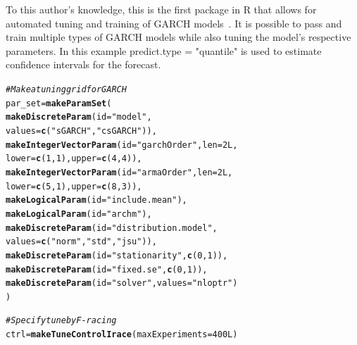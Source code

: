 \documentclass[12pt]{article}\usepackage[]{graphicx}\usepackage[]{color}
\makeatletter
\newcommand{\hlnum}[1]{\textcolor[rgb]{0.686,0.059,0.569}{#1}}%
\newcommand{\hlstr}[1]{\textcolor[rgb]{0.192,0.494,0.8}{#1}}%
\newcommand{\hlcom}[1]{\textcolor[rgb]{0.678,0.584,0.686}{\textit{#1}}}%
\newcommand{\hlstd}[1]{\textcolor[rgb]{0.345,0.345,0.345}{#1}}%
\newcommand{\hlkwb}[1]{\textcolor[rgb]{0.69,0.353,0.396}{#1}}%
\newcommand{\hlkwc}[1]{\textcolor[rgb]{0.333,0.667,0.333}{#1}}%
\newcommand{\hlkwd}[1]{\textcolor[rgb]{0.737,0.353,0.396}{\textbf{#1}}}%
\newenvironment{kframe}{%
 \def\at@end@of@kframe{}%
 \ifinner\ifhmode%
  \def\at@end@of@kframe{\end{minipage}}%
  \begin{minipage}{\columnwidth}%
 \fi\fi%
 \def\FrameCommand##1{\hskip\@totalleftmargin \hskip-\fboxsep
 \colorbox{shadecolor}{##1}\hskip-\fboxsep
     \hskip-\linewidth \hskip-\@totalleftmargin \hskip\columnwidth}%
 \MakeFramed {\advance\hsize-\width
   \@totalleftmargin\z@ \linewidth\hsize
   \@setminipage}}%
 {\par\unskip\endMakeFramed%
 \at@end@of@kframe}
\newenvironment{knitrout}{}{} %
\theoremstyle{definition}
\newcommand\code{\@codex}
\def\@codex#1{{\normalfont\ttfamily\hyphenchar\font=-1 #1}}
\let\proglang=\textsf
\makeatother
\begin{document}
To this author's knowledge, this is the first package in \proglang{R} that allows for automated tuning and training of GARCH models~\cite{garchengels}. It is possible to pass and train multiple types of GARCH models while also tuning the model's respective parameters. In this example \code{predict.type = "quantile"} is used to estimate confidence intervals for the forecast.

\singlespacing
\begin{knitrout}
\color{fgcolor}\begin{kframe}
\begin{alltt}
\hlcom{# Make a tuning grid for GARCH}
\hlstd{par_set} \hlkwb{=} \hlkwd{makeParamSet}\hlstd{(}
  \hlkwd{makeDiscreteParam}\hlstd{(}\hlkwc{id} \hlstd{=} \hlstr{"model"}\hlstd{,}
                    \hlkwc{values} \hlstd{=} \hlkwd{c}\hlstd{(}\hlstr{"sGARCH"}\hlstd{,} \hlstr{"csGARCH"}\hlstd{)),}
  \hlkwd{makeIntegerVectorParam}\hlstd{(}\hlkwc{id} \hlstd{=} \hlstr{"garchOrder"}\hlstd{,} \hlkwc{len} \hlstd{=} \hlnum{2L}\hlstd{,}
                         \hlkwc{lower} \hlstd{=} \hlkwd{c}\hlstd{(}\hlnum{1}\hlstd{,}\hlnum{1}\hlstd{),} \hlkwc{upper} \hlstd{=} \hlkwd{c}\hlstd{(}\hlnum{4}\hlstd{,}\hlnum{4}\hlstd{)),}
  \hlkwd{makeIntegerVectorParam}\hlstd{(}\hlkwc{id} \hlstd{=} \hlstr{"armaOrder"}\hlstd{,} \hlkwc{len} \hlstd{=} \hlnum{2L}\hlstd{,}
                         \hlkwc{lower} \hlstd{=} \hlkwd{c}\hlstd{(}\hlnum{5}\hlstd{,}\hlnum{1}\hlstd{),} \hlkwc{upper} \hlstd{=} \hlkwd{c}\hlstd{(}\hlnum{8}\hlstd{,}\hlnum{3}\hlstd{)),}
  \hlkwd{makeLogicalParam}\hlstd{(}\hlkwc{id} \hlstd{=} \hlstr{"include.mean"}\hlstd{),}
  \hlkwd{makeLogicalParam}\hlstd{(}\hlkwc{id} \hlstd{=} \hlstr{"archm"}\hlstd{),}
  \hlkwd{makeDiscreteParam}\hlstd{(}\hlkwc{id} \hlstd{=} \hlstr{"distribution.model"}\hlstd{,}
                    \hlkwc{values} \hlstd{=} \hlkwd{c}\hlstd{(}\hlstr{"norm"}\hlstd{,}\hlstr{"std"}\hlstd{,}\hlstr{"jsu"}\hlstd{)),}
  \hlkwd{makeDiscreteParam}\hlstd{(}\hlkwc{id} \hlstd{=} \hlstr{"stationarity"}\hlstd{,} \hlkwd{c}\hlstd{(}\hlnum{0}\hlstd{,}\hlnum{1}\hlstd{)),}
  \hlkwd{makeDiscreteParam}\hlstd{(}\hlkwc{id} \hlstd{=} \hlstr{"fixed.se"}\hlstd{,} \hlkwd{c}\hlstd{(}\hlnum{0}\hlstd{,}\hlnum{1}\hlstd{)),}
  \hlkwd{makeDiscreteParam}\hlstd{(}\hlkwc{id} \hlstd{=} \hlstr{"solver"}\hlstd{,} \hlkwc{values} \hlstd{=} \hlstr{"nloptr"}\hlstd{)}
\hlstd{)}

\hlcom{#Specify tune by F-racing}
\hlstd{ctrl} \hlkwb{=} \hlkwd{makeTuneControlIrace}\hlstd{(}\hlkwc{maxExperiments} \hlstd{=} \hlnum{400L}\hlstd{)}


\end{alltt}
\end{kframe}
\end{knitrout}
\end{document}
